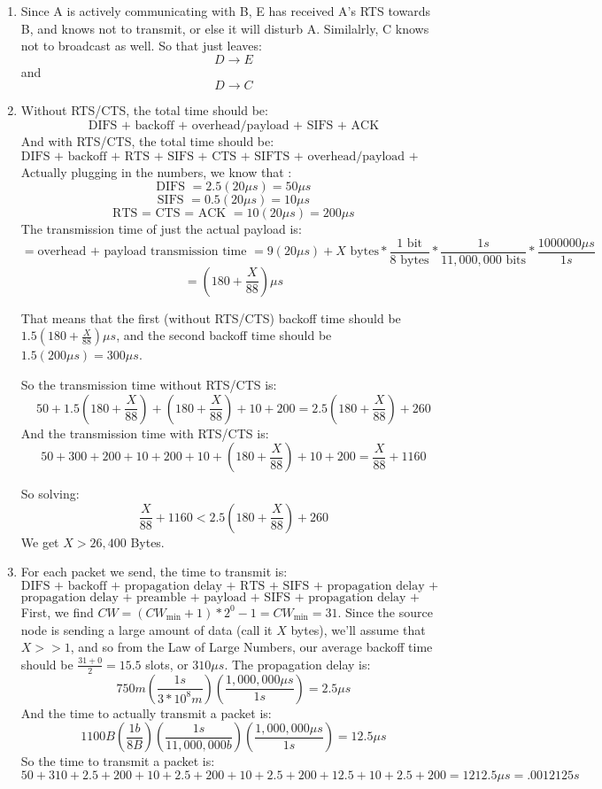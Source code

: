 \begin{enumerate}
  \item Since A is actively communicating with B, E has received A's RTS towards B, and knows not to transmit, or else it will disturb A. Similalrly, C knows not to broadcast as well. So that just leaves:
    $$D \rightarrow E$$
    and
    $$D \rightarrow C$$

  \item Without RTS/CTS, the total time should be:
    $$\text{DIFS + backoff + overhead/payload + SIFS + ACK}$$
    And with RTS/CTS, the total time should be:
    $$\text{DIFS + backoff + RTS + SIFS + CTS + SIFTS + overhead/payload + SIFS + ACK}$$
    Actually plugging in the numbers, we know that :
    $$\text{DIFS } = 2.5(20 \mu s) = 50 \mu s$$
    $$\text{SIFS } = 0.5(20 \mu s) = 10 \mu s$$
    $$\text{RTS = CTS = ACK } = 10(20 \mu s) = 200 \mu s$$
    The transmission time of just the actual payload is:
    $$= \text{overhead + payload transmission time } = 9(20 \mu s) + X \text{ bytes} * \frac{1 \text{ bit}}{8 \text{ bytes}} * \frac{1s}{11,000,000 \text{ bits}} * \frac{1000000 \mu s}{1 s}$$
    $$= (180 + \frac{X}{88}) \mu s$$

    That means that the first (without RTS/CTS) backoff time should be $1.5(180 + \frac{X}{88}) \mu s$, and the second backoff time should be $1.5(200 \mu s) = 300 \mu s$.

    So the transmission time without RTS/CTS is:
    $$50 + 1.5(180 + \frac{X}{88}) + (180 + \frac{X}{88}) + 10 + 200 = 2.5(180 + \frac{X}{88}) + 260$$
    And the transmission time with RTS/CTS is:
    $$50 + 300 + 200 + 10 + 200 + 10 + (180 + \frac{X}{88}) + 10 + 200 = \frac{X}{88} + 1160$$

    So solving:
    $$\frac{X}{88} + 1160 < 2.5(180 + \frac{X}{88}) + 260$$
    We get $X > 26,400 $ Bytes.

  \item For each packet we send, the time to transmit is:
    $$\text{DIFS + backoff + propagation delay + RTS + SIFS + propagation delay + CTS + SIFS +}$$
    $$\text{propagation delay + preamble + payload + SIFS + propagation delay + ACK}$$
    First, we find $CW = (CW_{\min} + 1)*2^0 - 1 = CW_{\min} = 31$. Since the source node is sending a large amount of data (call it $X$ bytes), we'll assume that $X >> 1$, and so from the Law of Large Numbers, our average backoff time should be $\frac{31 + 0}{2} = 15.5$ slots, or $310 \mu s$. The propagation delay is:
    $$750m(\frac{1 s}{3 * 10^8 m})(\frac{1,000,000 \mu s}{1 s}) = 2.5 \mu s$$
    And the time to actually transmit a packet is:
    $$1100 B (\frac{1 b}{8 B})(\frac{1 s}{11,000,000 b})(\frac{1,000,000 \mu s}{1 s}) = 12.5 \mu s$$
    So the time to transmit a packet is:
    $$50 + 310 + 2.5 + 200 + 10 + 2.5 + 200 + 10 + 2.5 + 200 + 12.5 + 10 + 2.5 + 200 = 1212.5 \mu s = .0012125 s$$
    

\end{enumerate}
